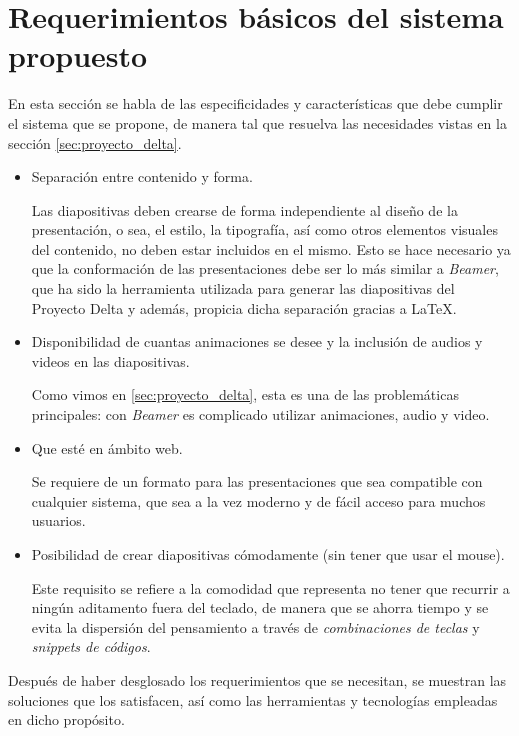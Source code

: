 	\section{Requerimientos básicos del sistema propuesto} %
	\label{sec:requerimientos_basicos_del_sistema_propuesto}
		En esta sección se habla de las especificidades y características que debe cumplir el sistema que se propone, de manera tal que resuelva las necesidades vistas en la sección \ref{sec:proyecto_delta}.
		\begin{itemize}
				\item Separación entre contenido y forma. 

					Las diapositivas deben crearse de forma independiente al diseño de la presentación, o sea, el estilo, la tipografía, así como otros elementos visuales del contenido, no deben estar incluidos en el mismo. Esto se hace necesario ya que la conformación de las presentaciones debe ser lo más similar a \textit{Beamer}, que ha sido la herramienta utilizada para generar las diapositivas del Proyecto Delta y además, propicia dicha separación gracias a \LaTeX{}.

				\item Disponibilidad de cuantas animaciones se desee y la inclusión de audios y videos en las diapositivas. 

					Como vimos en \ref{sec:proyecto_delta}, esta es una de las problemáticas principales: con \textit{Beamer} es complicado utilizar animaciones, audio y video.

				\item Que esté en ámbito web. 

					Se requiere de un formato para las presentaciones que sea compatible con cualquier sistema, que sea a la vez moderno y de fácil acceso para muchos usuarios.


				\item Posibilidad de crear diapositivas cómodamente (sin tener que usar el mouse). 

					Este requisito se refiere a la comodidad que representa no tener que recurrir a ningún aditamento fuera del teclado, de manera que se ahorra tiempo y se evita la dispersión del pensamiento a través de \textit{combinaciones de teclas} y \textit{snippets de códigos}.
		\end{itemize}	


	Después de haber desglosado los requerimientos que se necesitan, se muestran las soluciones que los satisfacen, así como las herramientas y tecnologías empleadas en dicho propósito. 

